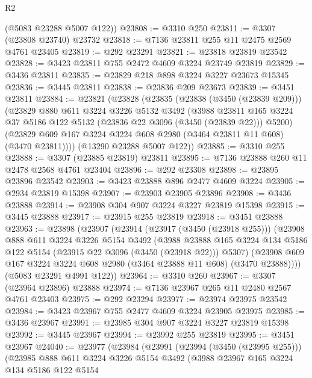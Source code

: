 \begin{lexlean}{R2}
\begin{coremodule}
      (@5083 @23288 @5007 @122))
@23808 := @3310 @250
@23811 := @3307 (@23808 @23740) @23732
@23818 := @7136 @23811 @255 @11 @2475 @2569 @4761 @23405
@23819 := @292 @23291
@23821 := @23818 @23819 @23542
@23828 := @3423 @23811 @755 @2472 @4609 @3224 @23749 @23819
@23829 := @3436 @23811
@23835 := @23829 @218 @898 @3224 @3227 @23673 @15345
@23836 := @3445 @23811
@23838 := @23836 @209 @23673
@23839 := @3451 @23811
@23884 := @23821
    (@23828
      (@23835
        (@23838 (@3450 (@23839 @209)))
        (@23829
          @880
          @611
          @3224
          @3226
          @5132
          @3492
          (@3988
            @23811
            @165
            @3224
            @37
            @5186
            @122
            @5132
            (@23836 @22 @3096 (@3450 (@23839 @22)))
            @5200)
          (@23829 @609 @167 @3224 @3224 @608 @2980 (@3464 @23811 @11 @608) (@3470 @23811))))
      (@13290 @23288 @5007 @122))
@23885 := @3310 @255
@23888 := @3307 (@23885 @23819) @23811
@23895 := @7136 @23888 @260 @11 @2478 @2568 @4761 @23404
@23896 := @292 @23308
@23898 := @23895 @23896 @23542
@23903 := @3423 @23888 @896 @2477 @4609 @3224
@23905 := @2934 @23819 @15398
@23907 := @23903 @23905 @23896
@23908 := @3436 @23888
@23914 := @23908 @304 @907 @3224 @3227 @23819 @15398
@23915 := @3445 @23888
@23917 := @23915 @255 @23819
@23918 := @3451 @23888
@23963 := @23898
    (@23907
      (@23914
        (@23917 (@3450 (@23918 @255)))
        (@23908
          @888
          @611
          @3224
          @3226
          @5154
          @3492
          (@3988
            @23888
            @165
            @3224
            @134
            @5186
            @122
            @5154
            (@23915 @22 @3096 (@3450 (@23918 @22)))
            @5307)
          (@23908 @609 @167 @3224 @3224 @608 @2980 (@3464 @23888 @11 @608) (@3470 @23888))))
      (@5083 @23291 @4991 @122))
@23964 := @3310 @260
@23967 := @3307 (@23964 @23896) @23888
@23974 := @7136 @23967 @265 @11 @2480 @2567 @4761 @23403
@23975 := @292 @23294
@23977 := @23974 @23975 @23542
@23984 := @3423 @23967 @755 @2477 @4609 @3224 @23905 @23975
@23985 := @3436 @23967
@23991 := @23985 @304 @907 @3224 @3227 @23819 @15398
@23992 := @3445 @23967
@23994 := @23992 @255 @23819
@23995 := @3451 @23967
@24040 := @23977
    (@23984
      (@23991
        (@23994 (@3450 (@23995 @255)))
        (@23985
          @888
          @611
          @3224
          @3226
          @5154
          @3492
          (@3988
            @23967
            @165
            @3224
            @134
            @5186
            @122
            @5154

\end{coremodule}
\end{lexlean}
